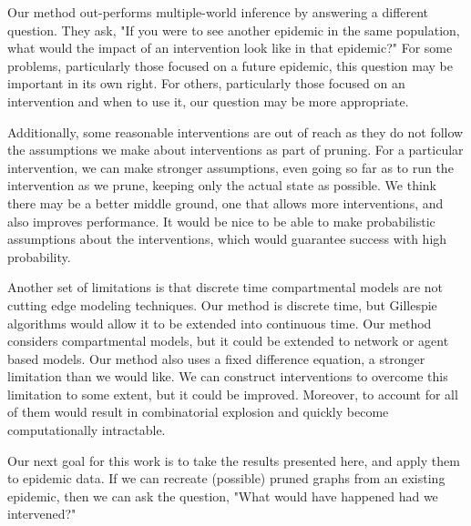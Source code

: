 \documentclass[openacc]{rsproca_new}%
\begin{document}
Our method out-performs multiple-world inference by answering a different question.
They ask, "If you were to see another epidemic in the same population, what would the impact of an intervention look like in that epidemic?"
For some problems, particularly those focused on a future epidemic, this question may be important in its own right.
For others, particularly those focused on an intervention and when to use it, our question may be more appropriate.

Additionally, some reasonable interventions are out of reach as they do not follow the assumptions we make about interventions as part of pruning.
For a particular intervention, we can make stronger assumptions, even going so far as to run the intervention as we prune, keeping only the actual state as possible.
We think there may be a better middle ground, one that allows more interventions, and also improves performance.
It would be nice to be able to make probabilistic assumptions about the interventions, which would guarantee success with high probability.

Another set of limitations is that discrete time compartmental models are not cutting edge modeling techniques.
Our method is discrete time, but Gillespie algorithms would allow it to be extended into continuous time.
Our method considers compartmental models, but it could be extended to network or agent based models.
Our method also uses a fixed difference equation, a stronger limitation than we would like.
We can construct interventions to overcome this limitation to some extent, but it could be improved.
Moreover, to account for all of them would result in  combinatorial explosion and quickly become computationally intractable. %

Our next goal for this work is to take the results presented here, and apply them to epidemic data.
If we can recreate (possible) pruned graphs from an existing epidemic, then we can ask the question, "What would have happened had we intervened?"

\enlargethispage{20pt}











\end{document}
